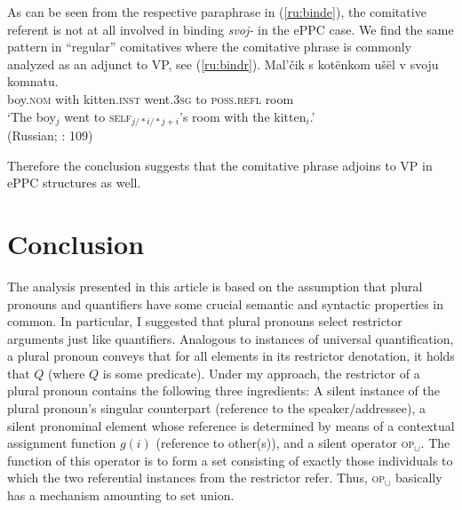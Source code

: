 \documentclass[output=paper,colorlinks,citecolor=brown]{langscibook}
\begin{document}
\noindent As can be seen from the respective paraphrase in (\ref{ru:binde}), the comitative referent is not at all involved in binding \textit{svoj-} in the ePPC case. We find the same pattern in ``regular'' comitatives where the comitative phrase is commonly analyzed as an adjunct to VP, see (\ref{ru:bindr}).
\ea
\gll Mal'čik s kotënkom ušël v svoju komnatu. \\
 boy.\textsc{nom} with kitten.\textsc{inst} went.\textsc{3sg} to \textsc{poss.refl} room \\
 \glt `The boy$_j$ went to \textsc{self}$_{j/*i/*j+i}$'s room with the kitten$_i$.' \\
 \hfill (Russian; \cite{VassilievaLarson2005}: 109) \label{ru:bindr}
\z

\noindent Therefore the conclusion suggests that the comitative phrase adjoins to VP in ePPC structures as well. 




\section{Conclusion}\label{sec:conclusion}
The analysis presented in this article is based on the assumption that plural pronouns and quantifiers have some crucial semantic and syntactic properties in common. In particular, I suggested that plural pronouns select restrictor arguments just like quantifiers. Analogous to instances of universal quantification, a plural pronoun conveys that for all elements in its restrictor denotation, it holds that $Q$ (where $Q$ is some predicate). Under my approach, the restrictor of a plural pronoun contains the following three ingredients: A silent instance of the plural pronoun's singular counterpart (reference to the speaker/addressee), a silent pronominal element whose reference is determined by means of a contextual assignment function $g(i)$ (reference to other(s)), and a silent operator \textsc{op}$_\cup$. The function of this operator is to form a set consisting of exactly those individuals to which the two referential instances from the restrictor refer. Thus, \textsc{op}$_\cup$ basically has a mechanism amounting to set union. 
\end{document}
